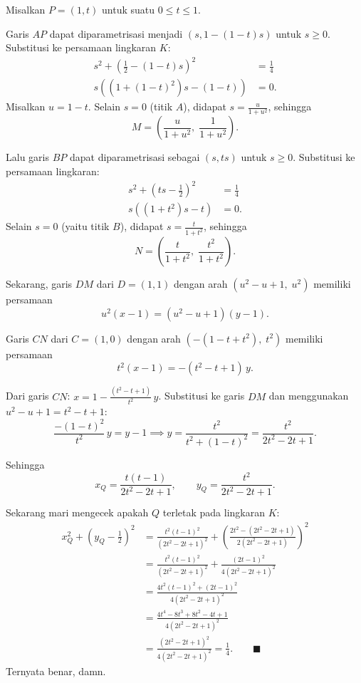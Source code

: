 \documentclass[a4paper, 12pt]{scrartcl}
\begin{document}
Misalkan $P=(1,t)$ untuk suatu $0\le t\le 1$.

Garis $AP$ dapat diparametrisasi menjadi $(s, 1-(1-t)s)$ untuk $s\ge 0$. Substitusi ke persamaan lingkaran $K$:
\begin{align*}
    s^2 + \left(\tfrac{1}{2}-(1-t)s\right)^2 &= \tfrac{1}{4}\\
    s\left((1+(1-t)^2)s - (1-t)\right) &= 0.
\end{align*}
Misalkan $u = 1-t$. Selain $s=0$ (titik $A$), didapat $s = \frac{u}{1+u^2}$, sehingga
\[M = \left(\frac{u}{1+u^2},\; \frac{1}{1+u^2}\right).\]

Lalu garis $BP$ dapat diparametrisasi sebagai $(s, ts)$ untuk $s\ge 0$. Substitusi ke persamaan lingkaran:
\begin{align*}
    s^2 + \left(ts-\tfrac{1}{2}\right)^2 &= \tfrac{1}{4}\\
    s\left((1+t^2)s - t\right) &= 0.
\end{align*}
Selain $s=0$ (yaitu titik $B$), didapat $s = \frac{t}{1+t^2}$, sehingga
\[N = \left(\frac{t}{1+t^2},\; \frac{t^2}{1+t^2}\right).\]

Sekarang, garis $DM$ dari $D=(1,1)$ dengan arah $(u^2-u+1,\; u^2)$ memiliki persamaan
\[u^2(x-1) = (u^2-u+1)(y-1).\]

Garis $CN$ dari $C=(1,0)$ dengan arah $(-(1-t+t^2),\; t^2)$ memiliki persamaan
\[t^2(x-1) = -(t^2-t+1)\,y.\]

Dari garis $CN$: $x = 1 - \frac{(t^2-t+1)}{t^2}\,y$. Substitusi ke garis $DM$ dan menggunakan $u^2-u+1 = t^2-t+1$:
\[\frac{-(1-t)^2}{t^2}\,y = y-1 \implies y = \frac{t^2}{t^2+(1-t)^2} = \frac{t^2}{2t^2-2t+1}.\]

Sehingga
\[x_Q = \frac{t(t-1)}{2t^2-2t+1}, \qquad y_Q = \frac{t^2}{2t^2-2t+1}.\]

Sekarang mari mengecek apakah $Q$ terletak pada lingkaran $K$:
\begin{align*}
    x_Q^2 + \left(y_Q - \tfrac{1}{2}\right)^2 
    &= \frac{t^2(t-1)^2}{(2t^2-2t+1)^2} + \left(\frac{2t^2 - (2t^2-2t+1)}{2(2t^2-2t+1)}\right)^2\\
    &= \frac{t^2(t-1)^2}{(2t^2-2t+1)^2} + \frac{(2t-1)^2}{4(2t^2-2t+1)^2}\\
    &= \frac{4t^2(t-1)^2 + (2t-1)^2}{4(2t^2-2t+1)^2}\\
    &= \frac{4t^4-8t^3+8t^2-4t+1}{4(2t^2-2t+1)^2}\\
    &= \frac{(2t^2-2t+1)^2}{4(2t^2-2t+1)^2} = \frac{1}{4}. \qquad \blacksquare
\end{align*}
Ternyata benar, damn.
\end{document}
